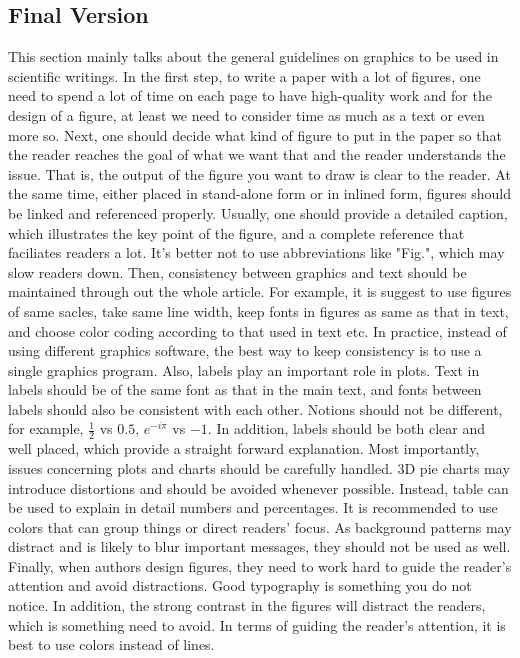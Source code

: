 \documentclass[paper=a4, fontsize=11pt]{scrartcl} %
\numberwithin{equation}{section} %
\numberwithin{figure}{section} %
\numberwithin{table}{section} %
\begin{document}
	\subsection{Final Version}
		This section mainly talks about the general guidelines on graphics to be used in scientific writings. \newline
		In the first step, to write a paper with a lot of figures, one need to spend a lot of time on each page to have high-quality work and for the design of a figure, at least we need to consider time as much as a text or even more so.\newline
		Next, one should decide what kind of figure to put in the paper so that the reader reaches the goal of what we want that and the reader understands the issue. That is, the output of the figure you want to draw is clear to the reader.\newline
		At the same time, either placed in stand-alone form or in inlined form, figures should be linked and referenced properly. Usually, one should provide a detailed caption, which illustrates the key point of the figure, and a complete reference that faciliates readers a lot. It's better not to use abbreviations like "Fig.", which may slow readers down. \newline
		Then, consistency between graphics and text should be maintained through out the whole article. For example, it is suggest to use figures of same sacles, take same line width, keep fonts in figures as same as that in text, and choose color coding according to that used in text etc. In practice, instead of using different graphics software, the best way to keep consistency is to use a single graphics program. \newline
		Also, labels play an important role in plots. Text in labels should be of the same font as that in the main text, and fonts between labels should also be consistent with each other. Notions should not be different, for example, $\frac{1}{2}$ vs $0.5$, $e^{-i\pi}$ vs $-1$. In addition, labels should be both clear and well placed, which provide a straight forward explanation.\newline
		Most importantly, issues concerning plots and charts should be carefully handled. 3D pie charts may introduce distortions and should be avoided whenever possible. Instead, table can be used to explain in detail numbers and percentages. It is recommended to use colors that can group things or direct readers' focus. As background patterns may distract and is likely to blur important messages, they should not be used as well. \newline
		Finally, when authors design figures, they need to work hard to guide the reader's attention and avoid distractions. Good typography is something you do not notice. In addition, the strong contrast in the figures will distract the readers, which is something need to avoid. In terms of guiding the reader's attention, it is best to use colors instead of lines.
		
\end{document}
